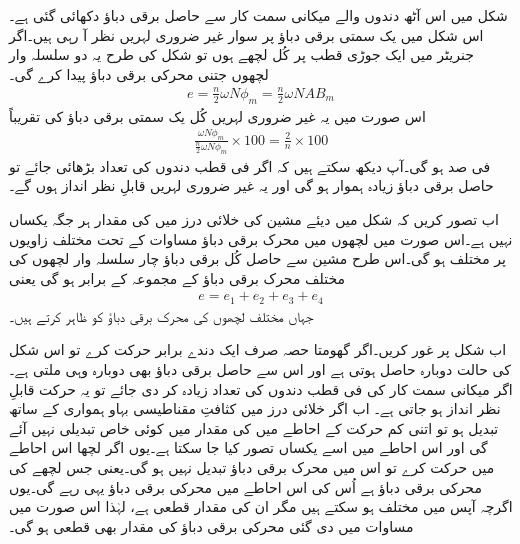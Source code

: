 شکل   میں اس آٹھ دندوں والے میکانی سمت کار سے حاصل برقی دباؤ دکھائی گئی ہے۔اس شکل میں یک سمتی برقی دباؤ پر سوار غیر ضروری لہریں نظر آ رہی ہیں۔اگر جنریٹر میں ایک جوڑی قطب پر کُل  لچھے ہوں تو شکل   کی طرح یہ دو   سلسلہ وار لچھوں جتنی محرکی برقی دباؤ پیدا کرے گی۔
\begin{align}\label{مساوات_یکسمتی_پیدا_دباؤ_الف}
e=\frac{n}{2} \omega N \phi_m=\frac{n}{2} \omega N A B_m
\end{align}
اس صورت میں یہ غیر ضروری لہریں کُل یک سمتی برقی دباؤ کی تقریباً
\begin{align}\label{مساوات_یکسمتی_فی_صد_لہر}
\frac{\omega N \phi_m}{\frac{n}{2} \omega N \phi_m} \times 100=\frac{2}{n} \times 100
\end{align}
فی صد ہو گی۔آپ دیکھ سکتے ہیں کہ اگر فی قطب دندوں کی تعداد بڑھائی جائے تو حاصل برقی دباؤ زیادہ ہموار ہو گی اور یہ غیر ضروری لہریں قابلِ نظر انداز ہوں گے۔

اب تصور کریں کہ شکل   میں دیئے مشین کی خلائی درز میں  کی مقدار ہر جگہ یکساں نہیں ہے۔اس صورت میں لچھوں میں محرک برقی دباؤ مساوات   کے تحت مختلف زاویوں پر مختلف ہو گی۔اس طرح مشین سے حاصل کُل برقی دباؤ چار سلسلہ وار لچھوں کی مختلف محرک برقی دباؤ کے مجموعہ کے برابر ہو گی یعنی
\begin{align} \label{مساوات_یکسمتی_کل_دباؤ_مجموعہ}
e=e_1+e_2+e_3+e_4
\end{align}
جہاں   مختلف لچھوں کی محرک برقی دباؤ کو ظاہر کرتے ہیں۔

اب شکل   پر غور کریں۔اگر گھومتا حصہ صرف ایک دندے برابر حرکت کرے تو اس شکل کی حالت  دوبارہ حاصل ہوتی ہے اور اس سے حاصل برقی دباؤ بھی دوبارہ وہی ملتی ہے۔اگر میکانی سمت کار کی فی قطب دندوں کی تعداد زیادہ کر دی جائے تو یہ حرکت قابلِ نظر انداز ہو جاتی ہے۔ اب اگر خلائی درز میں کثافتِ مقناطیسی بہاو ہمواری کے ساتھ تبدیل ہو تو اتنی کم حرکت کے احاطے میں  کی مقدار میں کوئی خاص تبدیلی نہیں آئے گی اور اس احاطے میں اسے یکساں تصور کیا جا سکتا ہے۔یوں اگر لچھا اس احاطے میں حرکت کرے تو اس میں محرک برقی دباؤ تبدیل نہیں ہو گی۔یعنی جس لچھے کی محرکی برقی دباؤ  ہے اُس کی اس احاطے میں محرکی برقی دباؤ یہی رہے گی۔یوں اگرچہ  آپس میں مختلف ہو سکتے ہیں مگر ان کی مقدار قطعی ہے، لہٰذا اس صورت میں مساوات   میں دی گئی محرکی برقی دباؤ کی مقدار بھی قطعی ہو گی۔ 

